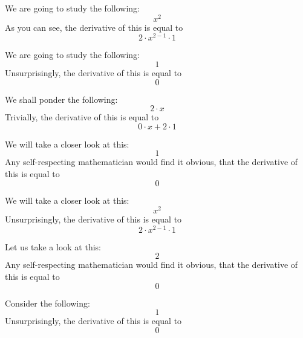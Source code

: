 \documentclass{article}
\begin{document}
We are going to study the following:
\begin{equation}
x ^{2 } 
\end{equation}
As you can see, the derivative of this is equal to
\begin{equation}
2 \cdot x ^{2 - 1 } \cdot 1 
\end{equation}

We are going to study the following:
\begin{equation}
1 
\end{equation}
Unsurprisingly, the derivative of this is equal to
\begin{equation}
0 
\end{equation}

We shall ponder the following:
\begin{equation}
2 \cdot x 
\end{equation}
Trivially, the derivative of this is equal to
\begin{equation}
0 \cdot x + 2 \cdot 1 
\end{equation}

We will take a closer look at this:
\begin{equation}
1 
\end{equation}
Any self-respecting mathematician would find it obvious, that the derivative of this is equal to
\begin{equation}
0 
\end{equation}

We will take a closer look at this:
\begin{equation}
x ^{2 } 
\end{equation}
Unsurprisingly, the derivative of this is equal to
\begin{equation}
2 \cdot x ^{2 - 1 } \cdot 1 
\end{equation}

Let us take a look at this:
\begin{equation}
2 
\end{equation}
Any self-respecting mathematician would find it obvious, that the derivative of this is equal to
\begin{equation}
0 
\end{equation}

Consider the following:
\begin{equation}
1 
\end{equation}
Unsurprisingly, the derivative of this is equal to
\begin{equation}
0 
\end{equation}
\end{document}
